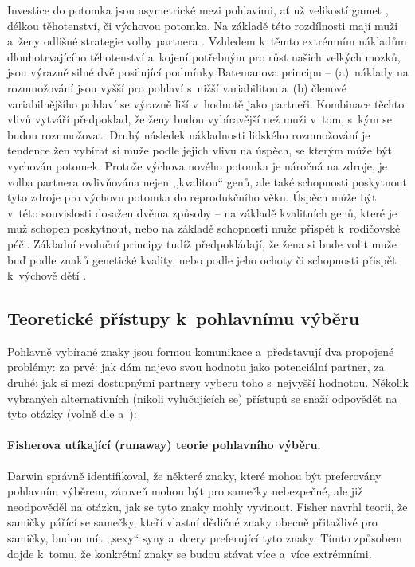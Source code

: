 \documentclass[a4paper, 12pt, notitlepage, oneside, numbers=noenddot]{report}
\begin{document}
Investice do potomka jsou asymetrické mezi pohlavími, ať už velikostí
gamet \citep{Dawkins1998}, délkou těhotenství, či výchovou potomka.
Na základě této rozdílnosti mají muži a~ženy odlišné strategie volby
partnera \citep{BussSchmitt1993}.  Vzhledem k~těmto ex\-trém\-ním
nákladům dlouhotrvajícího těhotenství a~kojení potřebným pro růst
našich velkých mozků, jsou výrazně silné dvě posilující podmínky
Batemanova principu -- (a)~náklady na roz\-mno\-žo\-vá\-ní jsou vyšší
pro pohlaví s~nižší variabilitou a~(b) členové variabilnějšího pohlaví
se výrazně liší v~hodnotě jako partneři.  Kombinace těchto vlivů
vytváří předpoklad, že ženy budou vybíravější než muži v~tom, s~kým se budou
rozmnožovat.  Druhý následek nákladnosti lidského rozmnožování je
tendence žen vybírat si muže podle jejich vlivu na úspěch, se kterým
může být vychován potomek.  Protože výchova nového potomka je náročná
na zdroje, je volba partnera ovlivňována nejen ,,kvalitou`` genů, ale
také schopnosti poskytnout tyto zdroje pro výchovu potomka do
reprodukčního věku.  Úspěch může být v~této souvislosti dosažen dvěma
způsoby -- na základě kvalitních genů, které je muž schopen
poskytnout, nebo na základě schopnosti muže přispět k~rodičovské péči.
Základní evoluční principy tudíž předpokládají, že žena si bude volit
muže buď podle znaků genetické kvality, nebo podle jeho ochoty či
schopnosti přispět k~výchově dětí \citep{BarrettDunbarLycett2007}.

\subsection{Teoretické přístupy k~pohlavnímu výběru}
Pohlavně vybírané znaky jsou formou komunikace a~představují dva
propojené problémy: za prvé: jak dám najevo svou hodnotu jako
potenciální partner, za druhé: jak si mezi dostupnými partnery
vyberu toho s~nejvyšší hodnotou.  Několik vybraných alternativních
(nikoli vylučujících se) přístupů se snaží odpovědět na tyto otázky
(volně dle \citealp{Barber1995} a~\citealp{Ridley2007}):

\paragraph{Fisherova utíkající (runaway) teorie pohlavního výběru.}
Darwin správně identifikoval, že některé znaky, které mohou být
preferovány pohlavním výběrem, zároveň mohou být pro samečky
nebezpečné, ale již neodpověděl na otázku, jak se tyto znaky mohly
vyvinout.  Fisher navrhl teorii, že samičky pářící se samečky, kteří
vlastní dědičné znaky obecně přitažlivé pro samičky, budou mít
,,sexy`` syny a~dcery preferující tyto znaky.  Tímto způsobem dojde
k~tomu, že konkrétní znaky se budou stávat více a~více extrémními.
\end{document}
